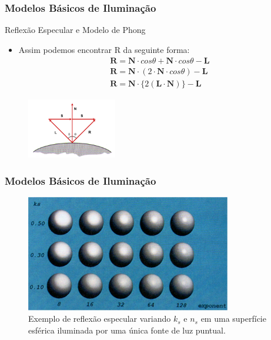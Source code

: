 \documentclass{beamer}
\begin{document}
\begin{frame}
\frametitle{Modelos Básicos de Iluminação}

	\begin{block}{Reflexão Especular e Modelo de Phong}
		\begin{itemize}
			\item Assim podemos encontrar R da seguinte forma:
				\begin{eqnarray*}
					\textbf{R} = \textbf{N} \cdot cos \theta +  \textbf{N} \cdot cos \theta - \textbf{L}\\
					\textbf{R} = \textbf{N} \cdot (2\cdot  \textbf{N} \cdot cos \theta) -\textbf{L} \\
					\textbf{R} = \textbf{N}\cdot  \{2 (\textbf{L} \cdot \textbf{N})\} -\textbf{L}
				\end{eqnarray*}
		\end{itemize}
	\end{block}
	
		\begin{figure}[!h]
		\begin{center}
		\includegraphics[width=0.35\textwidth]{Figures/ProRef}
		\end{center}
	\end{figure}	
\end{frame}


\begin{frame}
\frametitle{Modelos Básicos de Iluminação}
		\begin{figure}[!h]
		\begin{center}
		\includegraphics[width=0.8\textwidth]{Figures/ModPho}
		\caption{Exemplo de reflexão especular variando $k_s$ e $n_s$ em uma superfície esférica iluminada por uma única fonte de luz puntual.}
		\end{center}
	\end{figure}	
\end{frame}
\end{document}
